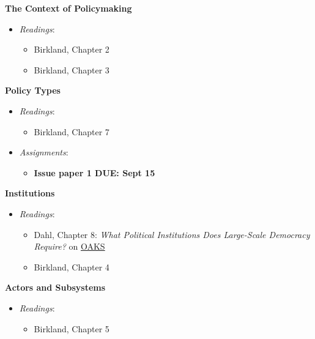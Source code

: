 \week \textbf{The Context of Policymaking}

\begin{itemize}

\item
  \emph{Readings}:

  \begin{itemize}
  
  \item
    Birkland, Chapter 2
  \item
    Birkland, Chapter 3
  \end{itemize}
\end{itemize}

\week \textbf{Policy Types}

\begin{itemize}

\item
  \emph{Readings}:

  \begin{itemize}
  
  \item
    Birkland, Chapter 7
  \end{itemize}
\item
  \emph{Assignments}:

  \begin{itemize}
  
  \item
    \textbf{Issue paper 1 DUE: Sept 15}
  \end{itemize}
\end{itemize}

\week \textbf{Institutions}

\begin{itemize}

\item
  \emph{Readings}:

  \begin{itemize}
  
  \item
    Dahl, Chapter 8: \emph{What Political Institutions Does Large-Scale
    Democracy Require?} on \href{https://lms.cofc.edu}{OAKS}
  \item
    Birkland, Chapter 4
  \end{itemize}
\end{itemize}

\week \textbf{Actors and Subsystems}

\begin{itemize}

\item
  \emph{Readings}:

  \begin{itemize}
  
  \item
    Birkland, Chapter 5
  \end{itemize}
\end{itemize}

